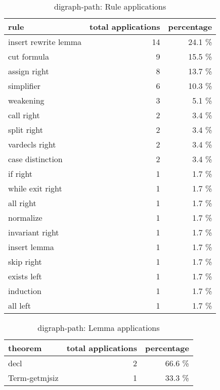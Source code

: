 \begin{table}[!ht]
	\centering

\begin{tabular}{l|r|r}
rule	        & total applications & percentage \\ \hline
insert rewrite lemma & 14 & 24.1 \% \\
cut formula & 9 & 15.5 \% \\
assign right & 8 & 13.7 \% \\
simplifier & 6 & 10.3 \% \\
weakening & 3 & 5.1 \% \\
call right & 2 & 3.4 \% \\
split right & 2 & 3.4 \% \\
vardecls right & 2 & 3.4 \% \\
case distinction & 2 & 3.4 \% \\
if right & 1 & 1.7 \% \\
while exit right & 1 & 1.7 \% \\
all right & 1 & 1.7 \% \\
normalize & 1 & 1.7 \% \\
invariant right & 1 & 1.7 \% \\
insert lemma & 1 & 1.7 \% \\
skip right & 1 & 1.7 \% \\
exists left & 1 & 1.7 \% \\
induction & 1 & 1.7 \% \\
all left & 1 & 1.7 \% \\

\end{tabular}

\caption{digraph-path: Rule applications}
	\label{tab:digraph-path-rule}
\end{table}

\begin{table}[!ht]
	\centering

\begin{tabular}{l|r|r}
theorem	        & total applications & percentage \\ \hline
decl & 2 & 66.6 \% \\
Term-getmjsiz & 1 & 33.3 \% \\

\end{tabular}

\caption{digraph-path: Lemma applications}
	\label{tab:digraph-path-lemma}
\end{table}
